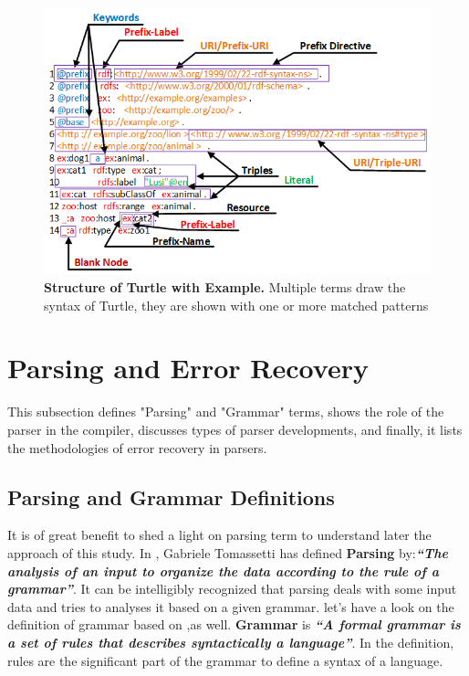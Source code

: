 \begin{figure}[ht]
	\begin{center}
		\includegraphics[scale=0.8,angle=0]{images/TurtleStructure.png}
		\setlength\belowcaptionskip{-5mm}
		\caption{\textbf{ Structure of Turtle with Example.} Multiple terms draw the syntax of Turtle, they are shown with one or more matched patterns}
		\label{Fig:TurtleStructure}
	\end{center}
\end{figure}
\section{Parsing and Error Recovery}
\label{sec:bck_parser}
This subsection defines "Parsing" and "Grammar" terms, shows the role of the parser in the compiler, discusses types of parser developments, and finally, it lists the methodologies of error recovery in parsers. 
\subsection{Parsing and Grammar Definitions}
It is of great benefit to shed a light on parsing term to understand later the approach of this study. In \cite{parsingGuide2017}, Gabriele Tomassetti has defined \textbf{Parsing} by:{\it  \textbf{``The analysis of an input to organize the data according to the rule of a grammar''}}. It can be intelligibly recognized that parsing deals with some input data and tries to analyses it based on a given grammar. let's have a look on the definition of grammar based on  \cite{parsingGuide2017},as well. \textbf{Grammar} is 
{\it \textbf{``A formal grammar is a set of rules that describes syntactically a language''}}. In the definition, rules are the significant part of the grammar to define a syntax of a language.  
